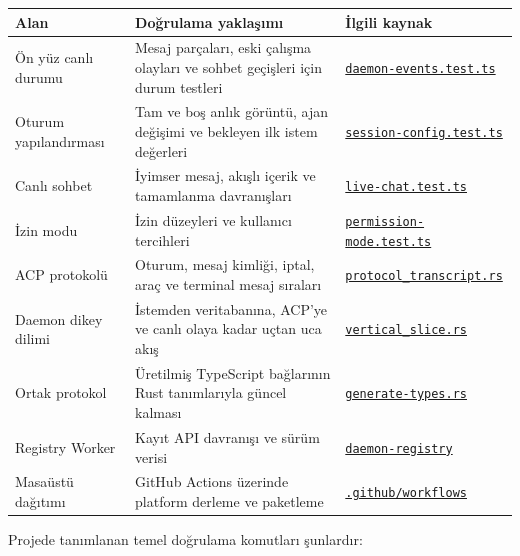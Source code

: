 \documentclass[
  turkish,
  10pt,
  a4paper,
]{article}
\begin{document}
\begin{longtable}[]{@{}lll@{}}
\toprule\noalign{}
Alan & Doğrulama yaklaşımı & İlgili kaynak \\
\midrule\noalign{}
\endhead
\bottomrule\noalign{}
\endlastfoot
Ön yüz canlı durumu & Mesaj parçaları, eski çalışma olayları ve sohbet
geçişleri için durum testleri &
\href{https://github.com/amar-jay/amarcode/blob/main/crates/application/src/state/daemon-events.test.ts}{\texttt{daemon-events.test.ts}} \\
Oturum yapılandırması & Tam ve boş anlık görüntü, ajan değişimi ve
bekleyen ilk istem değerleri &
\href{https://github.com/amar-jay/amarcode/blob/main/crates/application/src/state/session-config.test.ts}{\texttt{session-config.test.ts}} \\
Canlı sohbet & İyimser mesaj, akışlı içerik ve tamamlanma davranışları &
\href{https://github.com/amar-jay/amarcode/blob/main/crates/application/src/state/live-chat.test.ts}{\texttt{live-chat.test.ts}} \\
İzin modu & İzin düzeyleri ve kullanıcı tercihleri &
\href{https://github.com/amar-jay/amarcode/blob/main/crates/application/src/state/permission-mode.test.ts}{\texttt{permission-mode.test.ts}} \\
ACP protokolü & Oturum, mesaj kimliği, iptal, araç ve terminal mesaj
sıraları &
\href{https://github.com/amar-jay/amarcode/blob/main/crates/amarcode-acp/tests/protocol_transcript.rs}{\texttt{protocol\_transcript.rs}} \\
Daemon dikey dilimi & İstemden veritabanına, ACP'ye ve canlı olaya kadar
uçtan uca akış &
\href{https://github.com/amar-jay/amarcode/blob/main/crates/daemon/tests/vertical_slice.rs}{\texttt{vertical\_slice.rs}} \\
Ortak protokol & Üretilmiş TypeScript bağlarının Rust tanımlarıyla
güncel kalması &
\href{https://github.com/amar-jay/amarcode/blob/main/crates/protocol/src/bin/generate-types.rs}{\texttt{generate-types.rs}} \\
Registry Worker & Kayıt API davranışı ve sürüm verisi &
\href{https://github.com/amar-jay/amarcode/tree/main/crates/daemon-registry}{\texttt{daemon-registry}} \\
Masaüstü dağıtımı & GitHub Actions üzerinde platform derleme ve
paketleme &
\href{https://github.com/amar-jay/amarcode/tree/main/.github/workflows}{\texttt{.github/workflows}} \\
\end{longtable}

Projede tanımlanan temel doğrulama komutları şunlardır:
\end{document}
